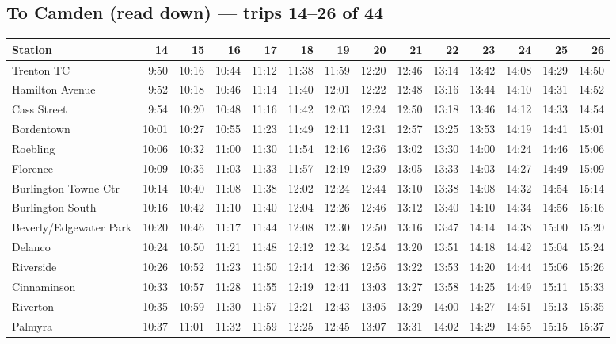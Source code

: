 \subsection*{To Camden (read down) --- trips 14--26 of 44}
\begin{center}\footnotesize\setlength{\tabcolsep}{3pt}\begin{tabular}{@{}lrrrrrrrrrrrrr@{}}\toprule
Station & 14 & 15 & 16 & 17 & 18 & 19 & 20 & 21 & 22 & 23 & 24 & 25 & 26 \\\midrule
Trenton TC & 9:50 & 10:16 & 10:44 & 11:12 & 11:38 & 11:59 & 12:20 & 12:46 & 13:14 & 13:42 & 14:08 & 14:29 & 14:50 \\
Hamilton Avenue & 9:52 & 10:18 & 10:46 & 11:14 & 11:40 & 12:01 & 12:22 & 12:48 & 13:16 & 13:44 & 14:10 & 14:31 & 14:52 \\
Cass Street & 9:54 & 10:20 & 10:48 & 11:16 & 11:42 & 12:03 & 12:24 & 12:50 & 13:18 & 13:46 & 14:12 & 14:33 & 14:54 \\
Bordentown & 10:01 & 10:27 & 10:55 & 11:23 & 11:49 & 12:11 & 12:31 & 12:57 & 13:25 & 13:53 & 14:19 & 14:41 & 15:01 \\
Roebling & 10:06 & 10:32 & 11:00 & 11:30 & 11:54 & 12:16 & 12:36 & 13:02 & 13:30 & 14:00 & 14:24 & 14:46 & 15:06 \\
Florence & 10:09 & 10:35 & 11:03 & 11:33 & 11:57 & 12:19 & 12:39 & 13:05 & 13:33 & 14:03 & 14:27 & 14:49 & 15:09 \\
Burlington Towne Ctr & 10:14 & 10:40 & 11:08 & 11:38 & 12:02 & 12:24 & 12:44 & 13:10 & 13:38 & 14:08 & 14:32 & 14:54 & 15:14 \\
Burlington South & 10:16 & 10:42 & 11:10 & 11:40 & 12:04 & 12:26 & 12:46 & 13:12 & 13:40 & 14:10 & 14:34 & 14:56 & 15:16 \\
Beverly/Edgewater Park & 10:20 & 10:46 & 11:17 & 11:44 & 12:08 & 12:30 & 12:50 & 13:16 & 13:47 & 14:14 & 14:38 & 15:00 & 15:20 \\
Delanco & 10:24 & 10:50 & 11:21 & 11:48 & 12:12 & 12:34 & 12:54 & 13:20 & 13:51 & 14:18 & 14:42 & 15:04 & 15:24 \\
Riverside & 10:26 & 10:52 & 11:23 & 11:50 & 12:14 & 12:36 & 12:56 & 13:22 & 13:53 & 14:20 & 14:44 & 15:06 & 15:26 \\
Cinnaminson & 10:33 & 10:57 & 11:28 & 11:55 & 12:19 & 12:41 & 13:03 & 13:27 & 13:58 & 14:25 & 14:49 & 15:11 & 15:33 \\
Riverton & 10:35 & 10:59 & 11:30 & 11:57 & 12:21 & 12:43 & 13:05 & 13:29 & 14:00 & 14:27 & 14:51 & 15:13 & 15:35 \\
Palmyra & 10:37 & 11:01 & 11:32 & 11:59 & 12:25 & 12:45 & 13:07 & 13:31 & 14:02 & 14:29 & 14:55 & 15:15 & 15:37 \\

\end{tabular}
\end{center}
